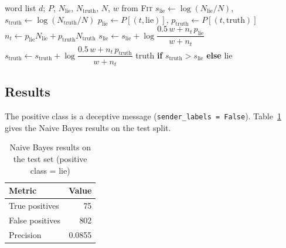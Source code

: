 \documentclass[11pt]{article}
\begin{document}
\begin{algorithm}[H]
  \caption{\textsc{Predict}$(d)$ for one message (applied with
  \textbf{Map} over the test RDD)}
  \begin{algorithmic}[1]
    \REQUIRE word list $d$; $P$, $N_{\text{lie}}$,
    $N_{\text{truth}}$, $N$, $w$ from \textsc{Fit}
    \STATE $s_{\text{lie}} \leftarrow \log(N_{\text{lie}} / N)$,
    \quad $s_{\text{truth}} \leftarrow \log(N_{\text{truth}} / N)$
    \STATE $p_{\text{lie}} \leftarrow P[(t, \text{lie})]$, \quad
    $p_{\text{truth}} \leftarrow P[(t, \text{truth})]$ 
    \STATE $n_t \leftarrow p_{\text{lie}} N_{\text{lie}} +
    p_{\text{truth}} N_{\text{truth}}$
    \STATE $s_{\text{lie}} \leftarrow s_{\text{lie}} +
    \log\dfrac{0.5\,w + n_t\, p_{\text{lie}}}{w + n_t}$
    \STATE $s_{\text{truth}} \leftarrow s_{\text{truth}} +
    \log\dfrac{0.5\,w + n_t\, p_{\text{truth}}}{w + n_t}$
    \ENDFOR
    \RETURN truth \textbf{if} $s_{\text{truth}} > s_{\text{lie}}$
    \textbf{else} lie
  \end{algorithmic}
\end{algorithm}

\subsection*{Results}
The positive class is a deceptive message (\texttt{sender\_labels =
False}). Table~\ref{tab:bayes} gives the Naive Bayes results on the test split.

\begin{table}[h]
  \centering
  \caption{Naive Bayes results on the test set (positive class =
  lie)}\label{tab:bayes}
  \begin{tabular}{|l|r|}
    \hline
    \textbf{Metric} & \textbf{Value} \\ \hline
    True positives & 75 \\
    False positives & 802 \\
    Precision & 0.0855 \\ \hline
  \end{tabular}
\end{table}
\end{document}
